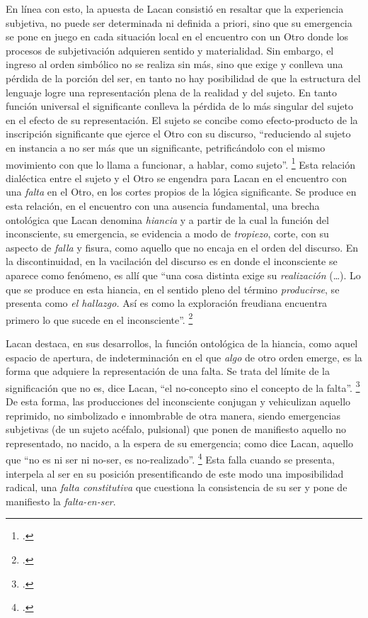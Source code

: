 En línea con esto, la apuesta de Lacan consistió en resaltar que la experiencia subjetiva, no puede ser determinada ni definida a priori, sino que su emergencia se pone en juego en cada situación local en el encuentro con un Otro donde los procesos de subjetivación adquieren sentido y materialidad. Sin embargo, el ingreso al orden simbólico no se realiza sin más, sino que exige y conlleva una pérdida de la porción del ser, en tanto no hay posibilidad de que la estructura del lenguaje logre una representación plena de la realidad y del sujeto. En tanto función universal el significante conlleva la pérdida de lo más singular del sujeto en el efecto de su representación. El sujeto se concibe como efecto-producto de la inscripción significante que ejerce el Otro con su discurso, \enquote{reduciendo al sujeto en instancia a no ser más que un significante, petrificándolo con el mismo movimiento con que lo llama a funcionar, a hablar, como sujeto}. \footcite[][215]{@7106-LACAN2006} Esta relación dialéctica entre el sujeto y el Otro se engendra para Lacan en el encuentro con una \emph{falta} en el Otro, en los cortes propios de la lógica significante. Se produce en esta relación, en el encuentro con una ausencia fundamental, una brecha ontológica que Lacan denomina \emph{hiancia} y a partir de la cual la función del inconsciente, su emergencia, se evidencia a modo de \emph{tropiezo}, corte, con su aspecto de \emph{falla} y fisura, como aquello que no encaja en el orden del discurso. En la discontinuidad, en la vacilación del discurso es en donde el inconsciente se aparece como fenómeno, es allí que \enquote{una cosa distinta exige su \emph{realización} (\ldots). Lo que se produce en esta hiancia, en el sentido pleno del término \emph{producirse}, se presenta como \emph{el hallazgo.} Así es como la exploración freudiana encuentra primero lo que sucede en el inconsciente}. \footcite[][33]{@7106-LACAN2006}

Lacan destaca, en sus desarrollos, la función ontológica de la hiancia, como aquel espacio de apertura, de indeterminación en el que \emph{algo} de otro orden emerge, es la forma que adquiere la representación de una falta. Se trata del límite de la significación que no es, dice Lacan, \enquote{el no-concepto sino el concepto de la falta}. \footcite[]{@7106-LACAN2006} De esta forma, las producciones del inconsciente conjugan y vehiculizan aquello reprimido, no simbolizado e innombrable de otra manera, siendo emergencias subjetivas (de un sujeto acéfalo, pulsional) que ponen de manifiesto aquello no representado, no nacido, a la espera de su emergencia; como dice Lacan, aquello que \enquote{no es ni ser ni no-ser, es no-realizado}. \footcite[][38]{@7106-LACAN2006} Esta falla cuando se presenta, interpela al ser en su posición presentificando de este modo una imposibilidad radical, una \emph{falta constitutiva} que cuestiona la consistencia de su ser y pone de manifiesto la \emph{falta-en-ser}.

